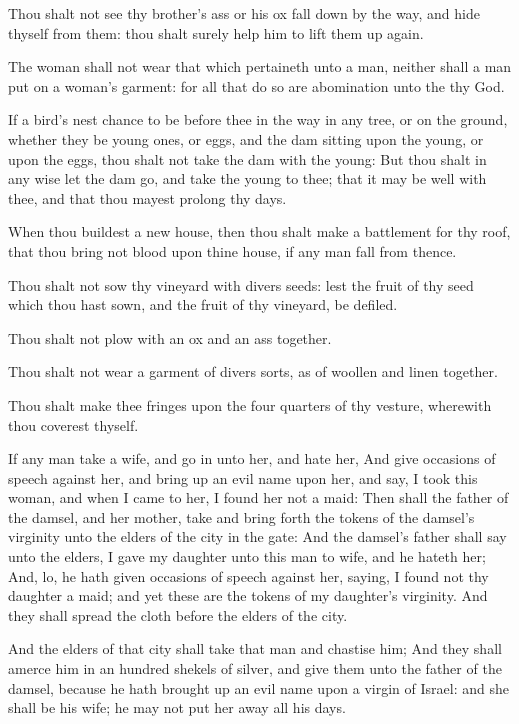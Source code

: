 \Verse Thou shalt not see thy brother's ass or his ox fall down by the way, and hide thyself from them: thou shalt surely help him to lift them up again.

\Verse The woman shall not wear that which pertaineth unto a man, neither shall a man put on a woman's garment: for all that do so are abomination unto the \LORD thy God.

\Verse If a bird's nest chance to be before thee in the way in any tree, or on the ground, whether they be young ones, or eggs, and the dam sitting upon the young, or upon the eggs, thou shalt not take the dam with the young: \Verse But thou shalt in any wise let the dam go, and take the young to thee; that it may be well with thee, and that thou mayest prolong thy days.

\Verse When thou buildest a new house, then thou shalt make a battlement for thy roof, that thou bring not blood upon thine house, if any man fall from thence.

\Verse Thou shalt not sow thy vineyard with divers seeds: lest the fruit of thy seed which thou hast sown, and the fruit of thy vineyard, be defiled.

\Verse Thou shalt not plow with an ox and an ass together.

\Verse Thou shalt not wear a garment of divers sorts, as of woollen and linen together.

\Verse Thou shalt make thee fringes upon the four quarters of thy vesture, wherewith thou coverest thyself.

\Verse If any man take a wife, and go in unto her, and hate her, \Verse And give occasions of speech against her, and bring up an evil name upon her, and say, I took this woman, and when I came to her, I found her not a maid: \Verse Then shall the father of the damsel, and her mother, take and bring forth the tokens of the damsel's virginity unto the elders of the city in the gate: \Verse And the damsel's father shall say unto the elders, I gave my daughter unto this man to wife, and he hateth her; \Verse And, lo, he hath given occasions of speech against her, saying, I found not thy daughter a maid; and yet these are the tokens of my daughter's virginity. And they shall spread the cloth before the elders of the city.

\Verse And the elders of that city shall take that man and chastise him; \Verse And they shall amerce him in an hundred shekels of silver, and give them unto the father of the damsel, because he hath brought up an evil name upon a virgin of Israel: and she shall be his wife; he may not put her away all his days.

